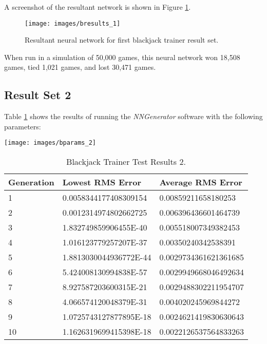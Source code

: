 A screenshot of the resultant network is shown in Figure \ref{bresults_1}.

\begin{figure}[h!]
  \centering
  \texttt{[image: images/bresults\_1]}
  \caption{Resultant neural network for first blackjack trainer result set.}
  \label{bresults_1}
\end{figure}

When run in a simulation of 50,000 games, this neural network won 18,508
games, tied 1,021 games, and lost 30,471 games.

\subsection{Result Set 2}
Table \ref{btr2} shows the results of running the {\it NNGenerator} software with the following parameters:

\begin{center}
\texttt{[image: images/bparams\_2]}
\end{center}

\begin{center}
    \begin{longtable}{ | l | l | l |}
      \caption{Blackjack Trainer Test Results 2.} \label{btr2} \\
   \hline
  Generation & Lowest RMS Error & Average RMS Error \\ \hline
1 &	0.0058344177408309154 &	0.00859211658180253 \\ \hline
2 &	0.0012314974802662725 &	0.006396436601464739 \\ \hline
3 &	1.832749859906455E-40 &	0.005518007349382453 \\ \hline
4 &	1.016123779257207E-37 &	0.00350240342538391 \\ \hline
5 &	1.8813030044936772E-44 &	0.0029734361621361685 \\ \hline
6 &	5.424008130994838E-57 &	0.0029949668046492634 \\ \hline
7 &	8.927587203600315E-21 &	0.0029488302211954707 \\ \hline
8 &	4.066574120048379E-31 &	0.004020245969844272 \\ \hline
9 &	1.0725743127877895E-18 &	0.0024621419830630643 \\ \hline
10 &	1.1626319699415398E-18 &	0.0022126537564833263 \\ \hline
\end{longtable}
\end{center}

